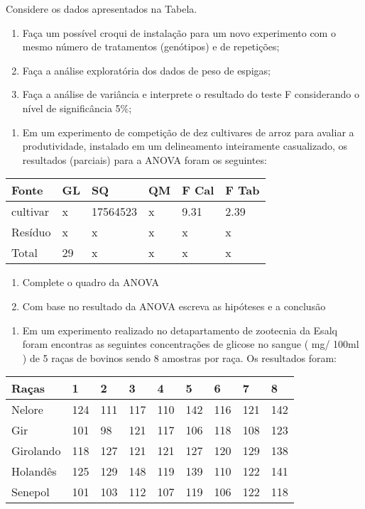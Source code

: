 \documentclass[
]{book}
\providecommand{\tightlist}{%
  \setlength{\itemsep}{0pt}\setlength{\parskip}{0pt}}
\begin{document}
Considere os dados apresentados na Tabela.

\begin{enumerate}
\def\labelenumi{\alph{enumi})}
\item
  Faça um possível croqui de instalação para um novo experimento com o mesmo número de tratamentos (genótipos) e de repetições;
\item
  Faça a análise exploratória dos dados de peso de espigas;
\item
  Faça a análise de variância e interprete o resultado do teste F considerando o nível de significância 5\%;
\end{enumerate}

\begin{enumerate}
\def\labelenumi{\arabic{enumi})}
\setcounter{enumi}{1}
\tightlist
\item
  Em um experimento de competição de dez cultivares de arroz para avaliar a produtividade, instalado em um delineamento inteiramente casualizado, os resultados (parciais) para a ANOVA foram os seguintes:
\end{enumerate}

\begin{longtable}[]{@{}llllll@{}}
\toprule()
Fonte & GL & SQ & QM & F Cal & F Tab \\
\midrule()
\endhead
cultivar & x & 17564523 & x & 9.31 & 2.39 \\
Resíduo & x & x & x & x & x \\
Total & 29 & x & x & x & x \\
\bottomrule()
\end{longtable}

\begin{enumerate}
\def\labelenumi{\alph{enumi})}
\item
  Complete o quadro da ANOVA
\item
  Com base no resultado da ANOVA escreva as hipóteses e a conclusão
\end{enumerate}

\begin{enumerate}
\def\labelenumi{\arabic{enumi})}
\setcounter{enumi}{2}
\tightlist
\item
  Em um experimento realizado no detapartamento de zootecnia da Esalq foram encontras as seguintes concentrações de glicose no sangue ( mg/ 100ml ) de 5 raças de bovinos sendo 8 amostras por raça. Os resultados foram:
\end{enumerate}

\begin{longtable}[]{@{}lllllllll@{}}
\toprule()
Raças & 1 & 2 & 3 & 4 & 5 & 6 & 7 & 8 \\
\midrule()
\endhead
Nelore & 124 & 111 & 117 & 110 & 142 & 116 & 121 & 142 \\
Gir & 101 & 98 & 121 & 117 & 106 & 118 & 108 & 123 \\
Girolando & 118 & 127 & 121 & 121 & 127 & 120 & 129 & 138 \\
Holandês & 125 & 129 & 148 & 119 & 139 & 110 & 122 & 141 \\
Senepol & 101 & 103 & 112 & 107 & 119 & 106 & 122 & 118 \\
\bottomrule()
\end{longtable}
\end{document}
